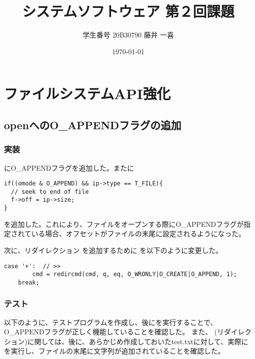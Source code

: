 \documentclass[platex,dvipdfmx, titlepage]{jlreq} %
\title{システムソフトウェア 第２回課題}
\author{学生番号 20B30790 藤井 一喜}
\date{\today}
\begin{document}
\maketitle

\section{ファイルシステムAPI強化}

\subsection{openへのO\_APPENDフラグの追加}

\subsubsection*{実装}

にO\_APPENDフラグを追加した。またに

\begin{lstlisting}[caption={kernel/fcntl.h}]
if((omode & O_APPEND) && ip->type == T_FILE){
  // seek to end of file
  f->off = ip->size;
}
\end{lstlisting}

\noindent を追加した。これにより、ファイルをオープンする際にO\_APPENDフラグが指定されている場合、オフセットがファイルの末尾に設定されるようになった。

\noindent 次に、リダイレクション \code{>>} を追加するために  を以下のように変更した。

\begin{lstlisting}[caption={user/sh.c}]
    case '+':  // >>
        cmd = redircmd(cmd, q, eq, O_WRONLY|O_CREATE|O_APPEND, 1);
    break;
\end{lstlisting}

\subsubsection*{テスト}

以下のように、テストプログラムを作成し、後にを実行することで、O\_APPENDフラグが正しく機能していることを確認した。
また、\code{>>} (リダイレクション)に関しては、後に、あらかじめ作成しておいたtest.txtに対して、実際にを実行し、ファイルの末尾に文字列が追加されていることを確認した。
\end{document}
